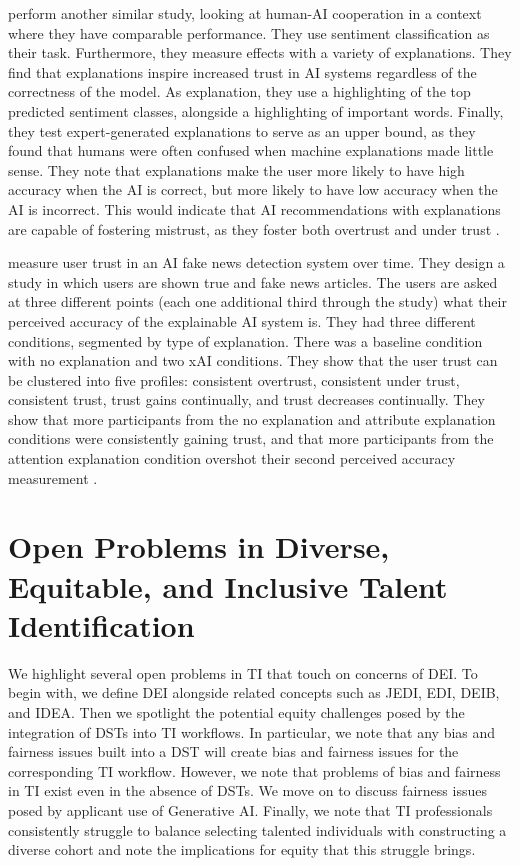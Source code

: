 \textcite{bansal_does_2021} perform another similar study, looking at human-AI cooperation in a context where they have comparable performance. They use sentiment classification as their task. Furthermore, they measure effects with a variety of explanations. They find that explanations inspire increased trust in AI systems regardless of the correctness of the model. As explanation, they use a highlighting of the top predicted sentiment classes, alongside a highlighting of important words. Finally, they test expert-generated explanations to serve as an upper bound, as they found that humans were often confused when machine explanations made little sense. They note that explanations make the user more likely to have high accuracy when the AI is correct, but more likely to have low accuracy when the AI is incorrect. This would indicate that AI recommendations with explanations are capable of fostering mistrust, as they foster both overtrust and under trust \cite{bansal_does_2021}.

\textcite{mohseni_trust_nodate} measure user trust in an AI fake news detection system over time. They design a study in which users are shown true and fake news articles. The users are asked at three different points (each one additional third through the study) what their perceived accuracy of the explainable AI system is. They had three different conditions, segmented by type of explanation. There was a baseline condition with no explanation and two xAI conditions. They show that the user trust can be clustered into five profiles: consistent overtrust, consistent under trust, consistent trust, trust gains continually, and trust decreases continually. They show that more participants from the no explanation and attribute explanation conditions were consistently gaining trust, and that more participants from the attention explanation condition overshot their second perceived accuracy measurement \cite{mohseni_trust_nodate}.

\section{Open Problems in Diverse, Equitable, and Inclusive Talent Identification}
We highlight several open problems in TI that touch on concerns of DEI. To begin with, we define DEI alongside related concepts such as JEDI, EDI, DEIB, and IDEA. Then we spotlight the potential equity challenges posed by the integration of DSTs into TI workflows. In particular, we note that any bias and fairness issues built into a DST will create bias and fairness issues for the corresponding TI workflow. However, we note that problems of bias and fairness in TI exist even in the absence of DSTs. We move on to discuss fairness issues posed by applicant use of Generative AI. Finally, we note that TI professionals consistently struggle to balance selecting talented individuals with constructing a diverse cohort and note the implications for equity that this struggle brings.  

